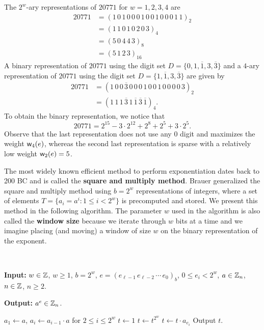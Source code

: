 \begin{exmp}
The $2^w$-ary representations of $20771$ for $w = 1, 2, 3, 4$ are 
\begin{align*}
    20771 &= (1\,0\,1\,0\,0\,0\,1\,0\,0\,1\,0\,0\,0\,1\,1)_2 \\
    &= (1\,1\,0\,1\,0\,2\,0\,3)_4 \\
    &= (5\,0\,4\,4\,3)_8 \\
    &= (5\,1\,2\,3)_{16}
\end{align*}
A binary representation of $20771$ using the digit set $D = \{0, 1, \overline1, 3, \overline3\}$ 
and a $4$-ary representation of $20771$ using the digit set $D = \{1, \overline1, 3, \overline3\}$ are given by 
\begin{align*}
    20771 &= (1\,0\,0\,\overline3\,0\,0\,0\,1\,0\,0\,1\,0\,0\,0\,0\,3)_2 \\
    &= (1\,1\,1\,\overline3\,1\,\overline1\,\overline3\,\overline1)_4.
\end{align*}
To obtain the binary representation, we notice that 
\[ 20771 = 2^{15} - 3 \cdot 2^{12} + 2^8 + 2^5 + 3 \cdot 2^5. \]
Observe that the last representation does not use any $0$ digit and maximizes the weight 
${\sf w}_4(e)$, whereas the second last representation is sparse with a relatively low weight ${\sf w}_2(e) = 5$.
\end{exmp}

The most widely known efficient method to perform exponentiation dates back to 200 BC and is called the 
{\bf square and multiply method}. Brauer generalized the square and multiply method using $b = 2^w$
representations of integers, where a set of elements $T = \{a_i = a^i : 1 \leq i < 2^w\}$ is 
precomputed and stored. We present this method in the following algorithm. The parameter 
$w$ used in the algorithm is also called the {\bf window size} because we iterate through $w$ 
bits at a time and we imagine placing (and moving) a window of size $w$ on the binary 
representation of the exponent. 

\begin{algo}~

{\bf Input:} $w \in \mathbb{Z}$, $w \geq 1$, $b = 2^w$, $e = (e_{\ell-1}\,e_{\ell-2}\,\cdots\,e_0)_b$, 
$0 \leq e_i < 2^w$, $a \in \mathbb{Z}_n$, $n \in \mathbb{Z}$, $n \geq 2$.

{\bf Output:} $a^e \in \mathbb{Z}_n$. \vspace{0.5em}

\begin{algorithmic}[1]
\State $a_1 \gets a$, $a_i \gets a_{i-1} \cdot a$ for $2 \leq i \leq 2^w$ 
\State $t \gets 1$
    \State $t \gets t^{2^w}$ 
        \State $t \gets t \cdot a_{e_i}$ 
    \EndIf
\EndFor
\State Output $t$. 
\end{algorithmic}
\end{algo}

